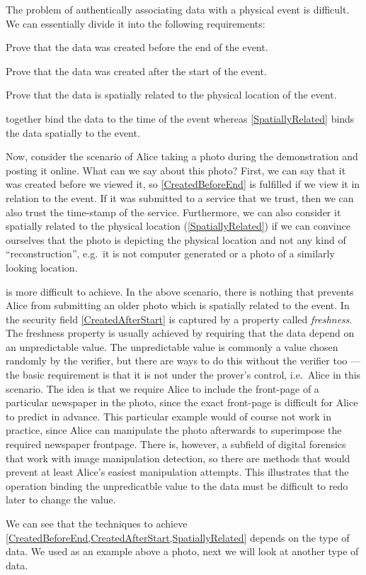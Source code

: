 The problem of authentically associating data with a physical event is 
difficult.
We can essentially divide it into the following requirements:
\begin{requirements}[A]
  \item\label{CreatedBeforeEnd} Prove that the data was created before the end 
    of the event.
  \item\label{CreatedAfterStart} Prove that the data was created after the 
    start of the event.
  \item\label{SpatiallyRelated} Prove that the data is spatially related to 
    the physical location of the event.
\end{requirements}
 together bind the data to the time of 
the event whereas \cref{SpatiallyRelated} binds the data spatially to the 
event.

Now, consider the scenario of Alice taking a photo during the demonstration and 
posting it online.
What can we say about this photo?
First, we can say that it was created before we viewed it, so 
\cref{CreatedBeforeEnd} is fulfilled if we view it in relation to the event.
If it was submitted to a service that we trust, then we can also trust the 
time-stamp of the service.
Furthermore, we can also consider it spatially related to the physical location
(\cref{SpatiallyRelated}) if we can convince ourselves that the photo is 
depicting the physical location and not any kind of \enquote{reconstruction}, 
e.g.\ it is not computer generated or a photo of a similarly looking location.

 is more difficult to achieve.
In the above scenario, there is nothing that prevents Alice from submitting an 
older photo which is spatially related to the event.
In the security field \cref{CreatedAfterStart} is captured by a property called 
\emph{freshness}.
The freshness property is usually achieved by requiring that the data depend on
an unpredictable value.
The unpredictable value is commonly a value chosen randomly by the verifier, 
but there are ways to do this without the verifier too --- the basic 
requirement is that it is not under the prover's control, i.e.\ Alice in this 
scenario.
The idea is that we require Alice to include the front-page of a particular 
newspaper in the photo, since the exact front-page is difficult for Alice to 
predict in advance.
This particular example would of course not work in practice, since Alice can 
manipulate the photo afterwards to superimpose the required newspaper 
frontpage.
There is, however, a subfield of digital forensics that work with image 
manipulation detection, so there are methods that would prevent at least 
Alice's easiest manipulation attempts.
This illustrates that the operation binding the unpredicatble value to the data 
must be difficult to redo later to change the value.

We can see that the techniques to achieve 
\cref{CreatedBeforeEnd,CreatedAfterStart,SpatiallyRelated} depends on the type 
of data.
We used as an example above a photo, next we will look at another type of data.
